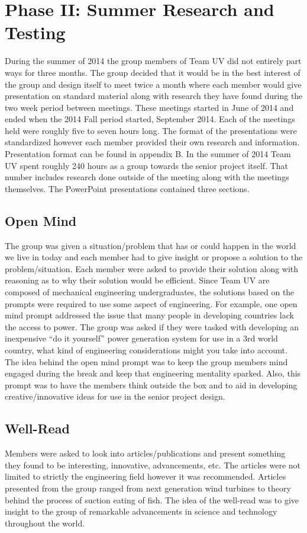 \documentclass{report}
\begin{document}
\chapter{Phase II: Summer Research and Testing}
During the summer of 2014 the group members of Team UV did not entirely part ways for three months. The group decided that it would be in the best interest of the group and design itself to meet twice a month where each member would give presentation on standard material along with research they have found during the two week period between meetings. These meetings started in June of 2014 and ended when the 2014 Fall period started, September 2014.  Each of the meetings held were roughly five to seven hours long. The format of the presentations were standardized however each member provided their own research and information. Presentation format can be found in appendix B. In the summer of 2014 Team UV spent roughly 240 hours as a group towards the senior project itself. That number includes research done outside of the meeting along with the meetings themselves. The PowerPoint presentations contained three sections.
\section{Open Mind}
The group was given a situation/problem that has or could happen in the world we live in today and each member had to give insight or propose a solution to the problem/situation. Each member were asked to provide their solution along with reasoning  as to why their solution would be efficient. Since Team UV are composed of mechanical engineering undergraduates, the solutions based on the prompts were required to use some aspect of engineering. For example, one open mind prompt addressed the issue that many people in developing countries lack the access to power. The group was asked if they were tasked with developing an inexpensive “do it yourself” power generation system for use in a 3rd world country, what kind of engineering considerations might you take into account. The idea behind the open mind prompt was to keep the group members mind engaged during the break and keep that engineering mentality sparked. Also, this prompt was to have the members think outside the box and to aid in developing creative/innovative ideas for use in the senior project design.
\section{Well-Read}
Members were asked to look into articles/publications and present something they found to be interesting, innovative, advancements, etc. The articles were not limited to strictly the engineering field however it was recommended.  Articles presented from the group ranged from next generation wind turbines to theory behind the process of suction eating of fish. The idea of the well-read was to give insight to the group of remarkable advancements in science and technology throughout the world.
\end{document}
